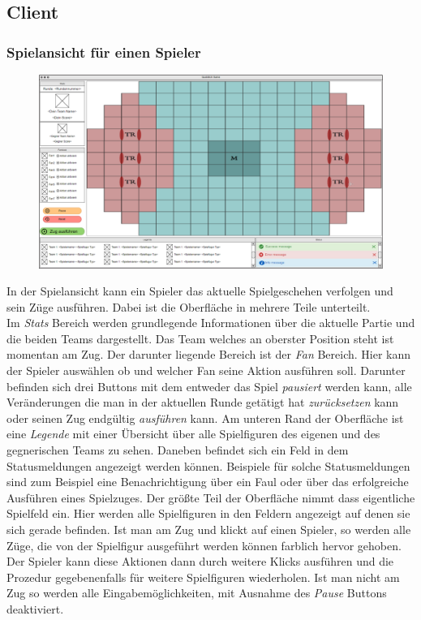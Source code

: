 \subsection{Client}

    \subsubsection{Spielansicht für einen Spieler}

    \begin{figure}[H]
        \centering
        \includegraphics[width=\textwidth]{images/InGamePlayer.PNG}
    \end{figure}

    In der Spielansicht kann ein Spieler das aktuelle Spielgeschehen verfolgen und sein Züge ausführen. Dabei ist die Oberfläche in mehrere Teile unterteilt.\\
    Im \textit{Stats} Bereich werden grundlegende Informationen über die aktuelle Partie und die beiden Teams dargestellt. Das Team welches an oberster Position steht ist momentan am Zug. Der darunter liegende Bereich ist der \textit{Fan} Bereich. Hier kann der Spieler auswählen ob und welcher Fan seine Aktion ausführen soll. Darunter befinden sich drei Buttons mit dem entweder das Spiel \textit{pausiert} werden kann, alle Veränderungen die man in der aktuellen Runde getätigt hat \textit{zurücksetzen} kann oder seinen Zug endgültig \textit{ausführen} kann. Am unteren Rand der Oberfläche ist eine \textit{Legende} mit einer Übersicht über alle Spielfiguren des eigenen und des gegnerischen Teams zu sehen. Daneben befindet sich ein Feld in dem Statusmeldungen angezeigt werden können. Beispiele für solche Statusmeldungen sind zum Beispiel eine Benachrichtigung über ein Faul oder über das erfolgreiche Ausführen eines Spielzuges. Der größte Teil der Oberfläche nimmt dass eigentliche Spielfeld ein. Hier werden alle Spielfiguren in den Feldern angezeigt auf denen sie sich gerade befinden. Ist man am Zug und klickt auf einen Spieler, so werden alle Züge, die von der Spielfigur ausgeführt werden können farblich hervor gehoben. Der Spieler kann diese Aktionen dann durch weitere Klicks ausführen und die Prozedur gegebenenfalls für weitere Spielfiguren wiederholen. Ist man nicht am Zug so werden alle Eingabemöglichkeiten, mit Ausnahme des \textit{Pause} Buttons deaktiviert.
    

